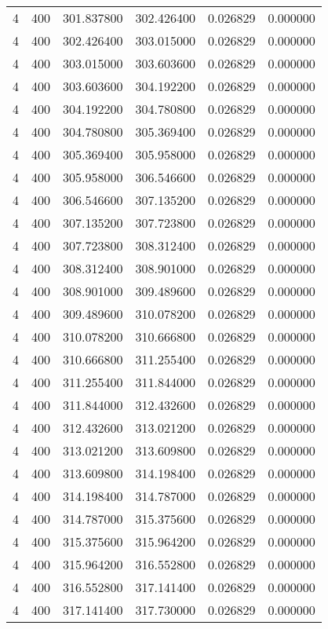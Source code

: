 \begin{longtable}{rrrrrr}
4 & 400 & 301.837800 & 302.426400 & 0.026829 & 0.000000 \\
4 & 400 & 302.426400 & 303.015000 & 0.026829 & 0.000000 \\
4 & 400 & 303.015000 & 303.603600 & 0.026829 & 0.000000 \\
4 & 400 & 303.603600 & 304.192200 & 0.026829 & 0.000000 \\
4 & 400 & 304.192200 & 304.780800 & 0.026829 & 0.000000 \\
4 & 400 & 304.780800 & 305.369400 & 0.026829 & 0.000000 \\
4 & 400 & 305.369400 & 305.958000 & 0.026829 & 0.000000 \\
4 & 400 & 305.958000 & 306.546600 & 0.026829 & 0.000000 \\
4 & 400 & 306.546600 & 307.135200 & 0.026829 & 0.000000 \\
4 & 400 & 307.135200 & 307.723800 & 0.026829 & 0.000000 \\
4 & 400 & 307.723800 & 308.312400 & 0.026829 & 0.000000 \\
4 & 400 & 308.312400 & 308.901000 & 0.026829 & 0.000000 \\
4 & 400 & 308.901000 & 309.489600 & 0.026829 & 0.000000 \\
4 & 400 & 309.489600 & 310.078200 & 0.026829 & 0.000000 \\
4 & 400 & 310.078200 & 310.666800 & 0.026829 & 0.000000 \\
4 & 400 & 310.666800 & 311.255400 & 0.026829 & 0.000000 \\
4 & 400 & 311.255400 & 311.844000 & 0.026829 & 0.000000 \\
4 & 400 & 311.844000 & 312.432600 & 0.026829 & 0.000000 \\
4 & 400 & 312.432600 & 313.021200 & 0.026829 & 0.000000 \\
4 & 400 & 313.021200 & 313.609800 & 0.026829 & 0.000000 \\
4 & 400 & 313.609800 & 314.198400 & 0.026829 & 0.000000 \\
4 & 400 & 314.198400 & 314.787000 & 0.026829 & 0.000000 \\
4 & 400 & 314.787000 & 315.375600 & 0.026829 & 0.000000 \\
4 & 400 & 315.375600 & 315.964200 & 0.026829 & 0.000000 \\
4 & 400 & 315.964200 & 316.552800 & 0.026829 & 0.000000 \\
4 & 400 & 316.552800 & 317.141400 & 0.026829 & 0.000000 \\
4 & 400 & 317.141400 & 317.730000 & 0.026829 & 0.000000 \\

\end{longtable}
